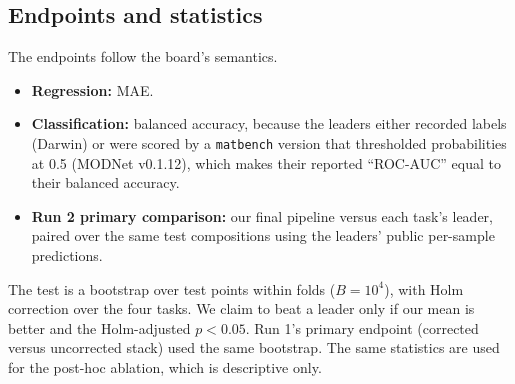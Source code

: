 \subsection{Endpoints and statistics}
The endpoints follow the board's semantics.
\begin{itemize}
\item \textbf{Regression:} MAE.
\item \textbf{Classification:} balanced accuracy, because the leaders either recorded labels (Darwin) or were scored by a \texttt{matbench} version that thresholded probabilities at 0.5 (MODNet v0.1.12), which makes their reported ``ROC-AUC'' equal to their balanced accuracy.
\item \textbf{Run 2 primary comparison:} our final pipeline versus each task's leader, paired over the same test compositions using the leaders' public per-sample predictions.
\end{itemize}

The test is a bootstrap over test points within folds ($B=10^4$), with Holm correction over the four tasks. We claim to beat a leader only if our mean is better and the Holm-adjusted $p<0.05$.
Run 1's primary endpoint (corrected versus uncorrected stack) used the same bootstrap. The same statistics are used for the post-hoc ablation, which is descriptive only.
